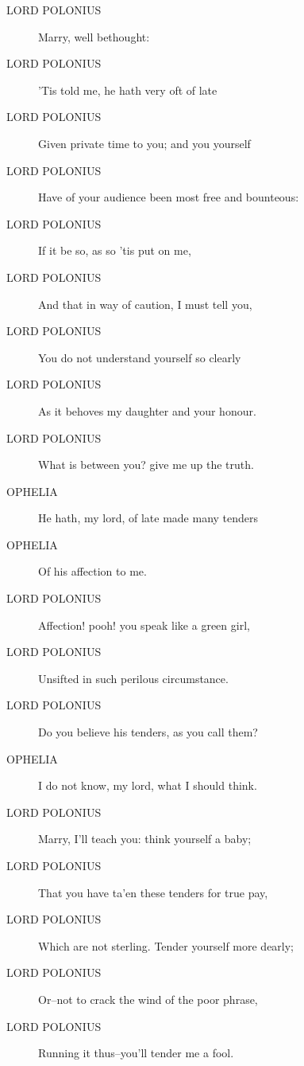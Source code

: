 \documentclass{article}
\begin{document}
\begin{description}
            
\item[LORD POLONIUS] Marry, well bethought:
\item[LORD POLONIUS] 'Tis told me, he hath very oft of late
\item[LORD POLONIUS] Given private time to you; and you yourself
\item[LORD POLONIUS] Have of your audience been most free and bounteous:
\item[LORD POLONIUS] If it be so, as so 'tis put on me,
\item[LORD POLONIUS] And that in way of caution, I must tell you,
\item[LORD POLONIUS] You do not understand yourself so clearly
\item[LORD POLONIUS] As it behoves my daughter and your honour.
\item[LORD POLONIUS] What is between you? give me up the truth.
\end{description}
          
\begin{description}
            
\item[OPHELIA] He hath, my lord, of late made many tenders
\item[OPHELIA] Of his affection to me.
\end{description}
          
\begin{description}
            
\item[LORD POLONIUS] Affection! pooh! you speak like a green girl,
\item[LORD POLONIUS] Unsifted in such perilous circumstance.
\item[LORD POLONIUS] Do you believe his tenders, as you call them?
\end{description}
          
\begin{description}
            
\item[OPHELIA] I do not know, my lord, what I should think.
\end{description}
          
\begin{description}
            
\item[LORD POLONIUS] Marry, I'll teach you: think yourself a baby;
\item[LORD POLONIUS] That you have ta'en these tenders for true pay,
\item[LORD POLONIUS] Which are not sterling. Tender yourself more dearly;
\item[LORD POLONIUS] Or--not to crack the wind of the poor phrase,
\item[LORD POLONIUS] Running it thus--you'll tender me a fool.
\end{description}
          
\end{document}
